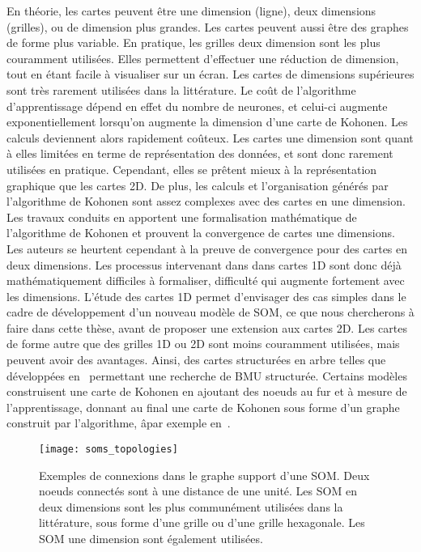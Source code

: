 \documentclass[../main]{subfiles}
\begin{document}
En théorie, les cartes peuvent être une dimension (ligne), deux dimensions (grilles), ou de dimension plus grandes. Les cartes peuvent aussi être des graphes de forme plus variable. En pratique, les grilles deux dimension sont les plus couramment utilisées. Elles permettent d'effectuer une réduction de dimension, tout en étant facile à visualiser sur un écran. Les cartes de dimensions supérieures sont très rarement utilisées dans la littérature. Le coût de l'algorithme d'apprentissage dépend en effet du nombre de neurones, et celui-ci augmente exponentiellement lorsqu'on augmente la dimension d'une carte de Kohonen. Les calculs deviennent alors rapidement coûteux.
Les cartes une dimension sont quant à elles limitées en terme de représentation des données, et sont donc rarement utilisées en pratique. Cependant, elles se prêtent mieux à la représentation graphique que les cartes 2D.
De plus, les calculs et l'organisation générés par l'algorithme de Kohonen sont assez complexes avec des cartes en une dimension. Les travaux conduits en \cite{cottrell_theoretical_2016,fort_soms_2006} apportent une formalisation mathématique de l'algorithme de Kohonen et prouvent la convergence de cartes une dimensions. Les auteurs se heurtent cependant à la preuve de convergence pour des cartes en deux dimensions.
Les processus intervenant dans dans cartes 1D sont donc déjà mathématiquement difficiles à formaliser, difficulté qui augmente fortement avec les dimensions.
L'étude des cartes 1D permet d'envisager des cas simples dans le cadre de développement d'un nouveau modèle de SOM, ce que nous chercherons à faire dans cette thèse, avant de proposer une extension aux cartes 2D.
Les cartes de forme autre que des grilles 1D ou 2D sont moins couramment utilisées, mais peuvent avoir des avantages. Ainsi, des cartes structurées en arbre telles que développées en~\cite{koikkalainen_self-organizing_1990} permettant une recherche de BMU structurée. Certains modèles construisent une carte de Kohonen en ajoutant des noeuds au fur et à mesure de l'apprentissage, donnant au final une carte de Kohonen sous forme d'un graphe construit par l'algorithme, âpar exemple en~\cite{alahakoon_dynamic_2000}.

\begin{figure}
\centering
\texttt{[image: soms\_topologies]}
\caption{Exemples de connexions dans le graphe support d'une SOM. Deux noeuds connectés sont à une distance de une unité. Les SOM en deux dimensions sont les plus communément utilisées dans la littérature, sous forme d'une grille ou d'une grille hexagonale. Les SOM une dimension sont également utilisées.}
\label{fig:topo}
\end{figure}
\end{document}
